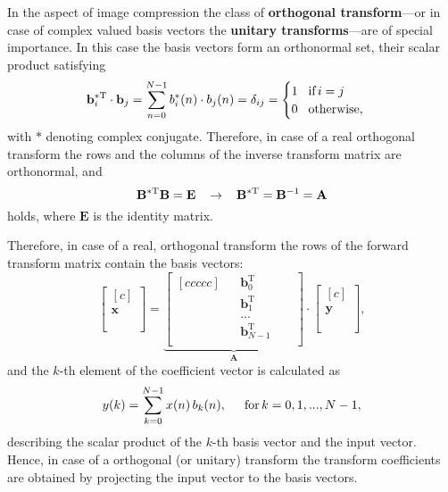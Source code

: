 \vspace{3mm}
In the aspect of image compression the class of \textbf{orthogonal transform}---or in case of complex valued basis vectors the \textbf{unitary transforms}---are of special importance.
In this case the basis vectors form an orthonormal set, their scalar product satisfying 
\begin{equation}
\mathbf{b}_i^{*\mathrm{T}} \cdot \mathbf{b}_j = \sum_{n = 0}^{N-1} b_i^*(n) \cdot b_j(n) = \delta_{ij} = \begin{cases} 1 \hspace{3mm} \text{if} \, i = j
\\ 0 \hspace{3mm} \text{otherwise},
\end{cases}
\end{equation}
with $*$ denoting complex conjugate.
Therefore, in case of a real orthogonal transform the rows and the columns of the inverse transform matrix are orthonormal, and
\begin{equation}
\mathbf{B}^{*\mathrm{T}} \mathbf{B} = \mathbf{E} \hspace{3mm} \rightarrow \hspace{3mm}
\mathbf{B}^{*\mathrm{T}}  = \mathbf{B}^{-1} = \mathbf{A}
\end{equation}
holds, where $\mathbf{E}$ is the identity matrix.

Therefore, in case of a real, orthogonal transform the rows of the forward transform matrix contain the basis vectors:
\begin{equation}
\begin{bmatrix}[c]
\\     
   \mathbf{x}  \\
\\     \\
\end{bmatrix}
= 
\underbrace{\begin{bmatrix}[c c c c c]
     & &   \mathbf{b}_0^{\mathrm{T}} & & \\ 
     & &  \mathbf{b}_1^{\mathrm{T}}  & &  \\
     & &  ...  &  & \\ 
     & &  \mathbf{b}_{N-1}^{\mathrm{T}} & & \\
\end{bmatrix}}_{\mathbf{A}} \cdot 
\begin{bmatrix}[c]
    \\   
   \mathbf{y}  \\
   \\    \\
\end{bmatrix},
\end{equation}
and the $k$-th element of the coefficient vector is calculated as
\begin{equation}
y(k) = \sum_{k=0}^{N-1} x(n) \, b_k (n), \hspace{5mm} \text{for} \, k = 0,1,...,N-1,
\end{equation}
describing the scalar product of the $k$-th basis vector and the input vector.
Hence, in case of a orthogonal (or unitary) transform the transform coefficients are obtained by projecting the input vector to the basis vectors.

